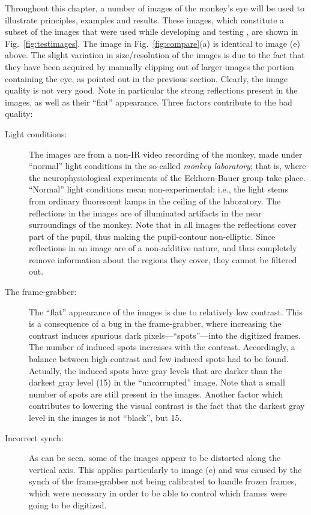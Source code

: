 \noindent Throughout this chapter, a number of images of the monkey's
eye will be used to illustrate principles, examples and results.
These images, which constitute a subset of the images that were used
while developing and testing {\octopus}, are shown in
Fig.~\ref{fig:testimages}.  The image in Fig.~\ref{fig:compare}(a) is
identical to image (e) above.  The slight variation in size/resolution
of the images is due to the fact that they have been acquired by
manually clipping out of larger images the portion containing the eye,
as pointed out in the previous section.  Clearly, the image quality is
not very good.  Note in particular the strong reflections present in
the images, as well as their ``flat'' appearance.  Three factors
contribute to the bad quality:
\begin{description}
\item[Light conditions:] The images are from a non-IR video recording
  of the monkey, made under ``normal'' light conditions in the
  so-called {\em monkey laboratory\/}; that is, where the
  neurophysiological experiments of the Eckhorn-Bauer group take
  place.  ``Normal'' light conditions mean non-experimental; i.e., the
  light stems from ordinary fluorescent lamps in the ceiling of the
  laboratory.  The reflections in the images are of illuminated
  artifacts in the near surroundings of the monkey.  Note that in all
  images the reflections cover part of the pupil, thus making the
  pupil-contour non-elliptic.  Since reflections in an image are of a
  non-additive nature, and thus completely remove information about
  the regions they cover, they cannot be filtered out.
\item[The frame-grabber:] The ``flat'' appearance of the images is due
  to relatively low contrast.  This is a consequence of a bug in the
  frame-grabber, where increasing the contrast induces spurious dark
  pixels---``spots''---into the digitized frames.  The number of
  induced spots increases with the contrast.  Accordingly, a balance
  between high contrast and few induced spots had to be found.
  Actually, the induced spots have gray levels that are darker than
  the darkest gray level (15) in the ``uncorrupted'' image.  Note that
  a small number of spots are still present in the images.  Another
  factor which contributes to lowering the visual contrast is the fact
  that the darkest gray level in the images is not ``black'', but 15.
\item[Incorrect synch:] As can be seen, some of the images appear to
  be distorted along the vertical axis.  This applies particularly to
  image (e) and was caused by the synch of the frame-grabber not
  being calibrated to handle frozen frames, which were necessary in
  order to be able to control which frames were going to be digitized.
\end{description}

